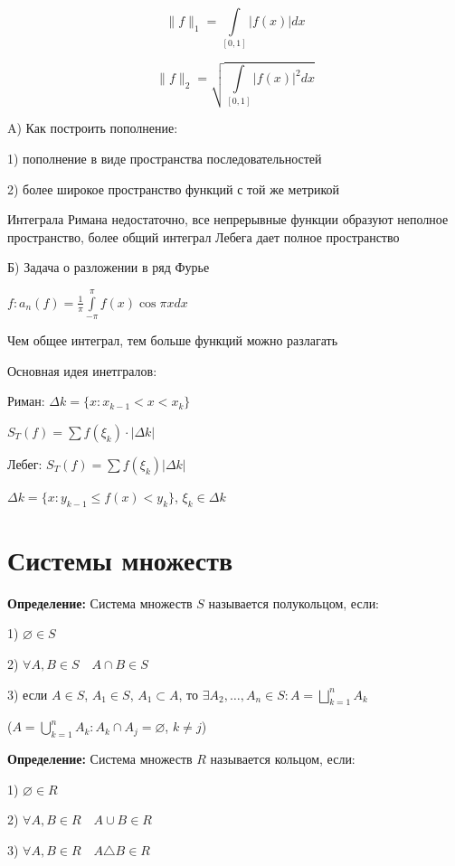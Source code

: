 \documentclass[a4paper]{report}
\begin{document}
$$\|f\|_1=\displaystyle\int\limits_{[0,1]}|f(x)|dx$$

$$\|f\|_2=\sqrt{\displaystyle\int\limits_{[0,1]}|f(x)|^2dx}$$

\noindent A) Как построить пополнение:

1) пополнение в виде пространства последовательностей

2) более широкое пространство функций с той же метрикой

Интеграла Римана недостаточно, все непрерывные функции образуют неполное пространство, более общий интеграл Лебега дает 
полное пространство

\noindent Б) Задача о разложении в ряд Фурье

$f\colon a_n(f)=\frac1\pi\displaystyle\int\limits_{-\pi}^\pi f(x)\cos\pi x dx$

Чем общее интеграл, тем больше функций можно разлагать

\noindent Основная идея инетгралов:

Риман: $\Delta k=\{x\colon x_{k-1}<x<x_k\}$

$S_T(f)=\sum f(\xi_k)\cdot|\Delta k|$

Лебег: $S_T(f)=\sum f(\xi_k)|\Delta k|$

$\Delta k=\{x\colon y_{k-1}\le f(x)<y_k\}$, $\xi_k\in\Delta k$








\chapter{Системы множеств}

\noindent\textbf{Определение:} Система множеств $S$ называется полукольцом, если:

1) $\varnothing\in S$

2) $\forall A,B\in S\quad A\cap B\in S$

3) если $A\in S$, $A_1\in S$, $A_1\subset A$, то $\exists A_2,\ldots,A_n\in S\colon A=\bigsqcup\limits_{k=1}^n A_k$ 

($A=\bigcup\limits_{k=1}^n A_k\colon A_k\cap A_j=\varnothing$, $k\ne j$)
\bigskip

\noindent\textbf{Определение:} Система множеств $R$ называется кольцом, если:

1) $\varnothing\in R$

2) $\forall A,B\in R\quad A\cup B\in R$

3) $\forall A,B\in R\quad A\triangle B\in R$
\end{document}
